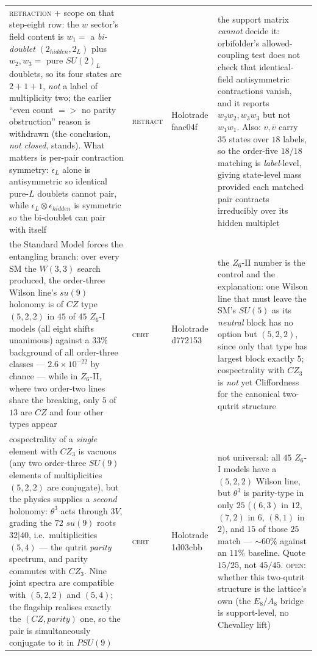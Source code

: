 \documentclass[12pt,a4paper]{article}
\def\mathbb#1{#1}%
\def\mathfrak#1{#1}%
\def\textbf#1{#1}%
\def\texttt#1{#1}%
\def\text#1{#1}%
\def\Rightarrow{ => }%
\theoremstyle{definition}
\newcommand{\ZZ}{\mathbb{Z}}
\begin{document}
\begin{center}
\begin{tabular}{@{}p{}llp{}@{}}
\textsc{retraction} + scope on that step-eight row: the $w$ sector's field content is $w_1=$ a \emph{bi-doublet} $(2_{\text{hidden}},2_L)$ plus $w_2,w_3=$ pure $SU(2)_L$ doublets, so its four states are $2{+}1{+}1$, \emph{not} a label of multiplicity two; the earlier ``even count $\Rightarrow$ no parity obstruction'' reason is withdrawn (the conclusion, \emph{not closed}, stands). What matters is per-pair contraction symmetry: $\epsilon_L$ alone is antisymmetric so identical pure-$L$ doublets cannot pair, while $\epsilon_L\otimes\epsilon_{\text{hidden}}$ is symmetric so the bi-doublet can pair with itself & \textsc{retract} & Holotrade \texttt{faac04f} & the support matrix \emph{cannot} decide it: orbifolder's allowed-coupling test does not check that identical-field antisymmetric contractions vanish, and it reports $w_2w_2,w_3w_3$ but not $w_1w_1$. Also: $v,\bar v$ carry $35$ states over $18$ labels, so the order-five $18/18$ matching is \emph{label}-level, giving state-level mass provided each matched pair contracts irreducibly over its hidden multiplet \\
\textbf{the Standard Model forces the entangling branch}: over every SM the $W(3,3)$ search produced, the order-three Wilson line's $\mathfrak{su}(9)$ holonomy is of $CZ$ type $(5,2,2)$ in $45$ of $45$ $\ZZ_6$-I models (all eight shifts unanimous) against a $33\%$ background of all order-three classes --- $2.6\times 10^{-22}$ by chance --- while in $\ZZ_6$-II, where two order-two lines share the breaking, only $5$ of $13$ are $CZ$ and four other types appear & \textsc{cert} & Holotrade \texttt{d772153} & the $\ZZ_6$-II number is the control and the explanation: one Wilson line that must leave the SM's $SU(5)$ as its \emph{neutral} block has no option but $(5,2,2)$, since only that type has largest block exactly $5$; cospectrality with $CZ_3$ is \emph{not} yet Cliffordness for the canonical two-qutrit structure \\
cospectrality of a \emph{single} element with $CZ_3$ is vacuous (any two order-three $SU(9)$ elements of multiplicities $(5,2,2)$ are conjugate), but the physics supplies a \emph{second} holonomy: $\theta^3$ acts through $3V$, grading the $72$ $\mathfrak{su}(9)$ roots $32|40$, i.e.\ multiplicities $(5,4)$ --- the qutrit \emph{parity} spectrum, and parity commutes with $CZ_3$. Nine joint spectra are compatible with $(5,2,2)$ and $(5,4)$; the flagship realises exactly the $(CZ,\text{parity})$ one, so the pair is simultaneously conjugate to it in $PSU(9)$ & \textsc{cert} & Holotrade \texttt{1d03cbb} & \textbf{not universal}: all $45$ $\ZZ_6$-I models have a $(5,2,2)$ Wilson line, but $\theta^3$ is parity-type in only $25$ ($(6,3)$ in $12$, $(7,2)$ in $6$, $(8,1)$ in $2$), and $15$ of those $25$ match --- $\sim 60\%$ against an $11\%$ baseline. Quote $15/25$, not $45/45$. \textsc{open}: whether this two-qutrit structure is the lattice's own (the $E_8/A_8$ bridge is support-level, no Chevalley lift) \\

\end{tabular}
\end{center}
\end{document}
